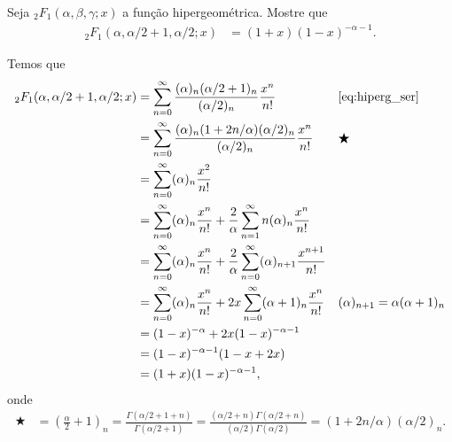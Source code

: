 \documentclass[a4paper,12pt, leqno, answers]{exam}
\begin{document}
\begin{questions}
    \question[E de 2011, E de 2012] Seja ${}_2F_1(\alpha, \beta, \gamma; x)$ a fun\c{c}\~{a}o hipergeom\'{e}trica. Mostre que
    \begin{align*}
        {}_2F_1(\alpha, \alpha/2 + 1, \alpha/2; x) &= (1 + x)(1 - x)^{-\alpha - 1}.
    \end{align*}
    \begin{solution}
        Temos que
        \begin{align*}
            {}_2F_1(\alpha, \alpha/2 + 1, \alpha/2; x) &= \sum_{n = 0}^\infty \frac{(\alpha)_n (\alpha/2 + 1)_n}{(\alpha/2)_n} \frac{x^n}{n!} && \text{\eqref{eq:hiperg_ser}} \\
            &= \sum_{n = 0}^\infty \frac{(\alpha)_n (1 + 2 n / \alpha)(\alpha/2)_n}{(\alpha/2)_ n} \frac{x^n}{n!} && \bigstar \\
            &= \sum_{n = 0}^\infty (\alpha)_n \frac{x^2}{n!} \\
            &= \sum_{n = 0}^\infty (\alpha)_n \frac{x^n}{n!} + \frac{2}{\alpha} \sum_{n = 1}^\infty n(\alpha)_n \frac{x^n}{n!} \\
            &= \sum_{n = 0}^\infty (\alpha)_n \frac{x^n}{n!} + \frac{2}{\alpha} \sum_{n = 0}^\infty (\alpha)_{n + 1} \frac{x^{n + 1}}{n!} \\
            &= \sum_{n = 0}^\infty (\alpha)_n \frac{x^n}{n!} + 2x \sum_{n = 0}^\infty (\alpha + 1)_n \frac{x^n}{n!} && (\alpha)_{n + 1} = \alpha (\alpha + 1)_n \\
            &= (1 - x)^{-\alpha} + 2 x (1 - x)^{-\alpha - 1} \\
            &= (1 - x)^{- \alpha - 1} (1 - x + 2x) \\
            &=(1 + x)(1 - x)^{-\alpha - 1},
        \end{align*}
        onde
        \begin{align*}
            \bigstar &= \left( \frac{\alpha}{2} + 1 \right)_n = \frac{\Gamma(\alpha/2 + 1 + n)}{\Gamma(\alpha/2 + 1)} = \frac{(\alpha/2 + n) \Gamma(\alpha/2 + n)}{(\alpha/2) \Gamma(\alpha/2)} = (1 + 2n/\alpha) (\alpha/2)_n.
        \end{align*}
    \end{solution}
\end{questions}


\end{document}
